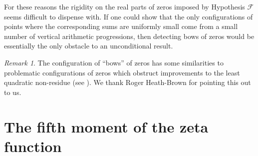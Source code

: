 \documentclass[12pt]{amsart}
\theoremstyle{plain}
\theoremstyle{definition}
\theoremstyle{remark}
\newtheorem{remark}[theorem]{Remark}
\begin{document}
For these reasons the rigidity on the real parts of zeros imposed by Hypothesis $\mathcal{F}$ seems difficult to dispense with. If one could show that the only configurations of points where the corresponding sums are uniformly small come from a small number of vertical arithmetic progressions, then detecting bows of zeros would be essentially the only obstacle to an unconditional result.


\begin{remark}
The configuration of ``bows'' of zeros has some similarities to problematic configurations of zeros which obstruct improvements to the least quadratic non-residue (see \cite[Appendix]{Diamond}). We thank Roger Heath-Brown for pointing this out to us.
\end{remark}

%
%
%
%
\appendix
%
%
%
%
\section{The fifth moment of the zeta function}
\end{document}
